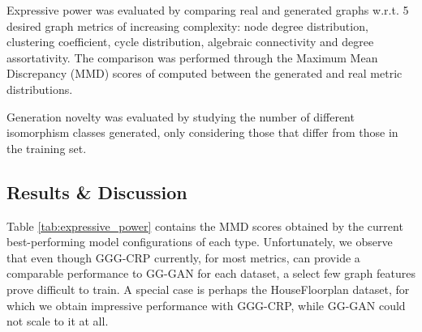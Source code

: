 Expressive power was evaluated by comparing real and generated graphs w.r.t. 5 desired graph metrics of increasing complexity: node degree distribution, clustering coefficient, cycle distribution, algebraic connectivity and degree assortativity. The comparison was performed through the Maximum Mean Discrepancy (MMD) scores of \cite{you_graphrnn_2018} computed between the generated and real metric distributions.

Generation novelty was evaluated by studying the number of different isomorphism classes generated, only considering those that differ from those in the training set.

\subsection{Results \& Discussion}
\label{sec:results_gggcrp}

Table \ref{tab:expressive_power} contains the MMD scores obtained by the current best-performing model configurations of each type. Unfortunately, we observe that even though GGG-CRP currently, for most metrics, can provide a comparable performance to GG-GAN for each dataset, a select few graph features prove difficult to train. A special case is perhaps the HouseFloorplan dataset, for which we obtain impressive performance with GGG-CRP, while GG-GAN could not scale to it at all.

